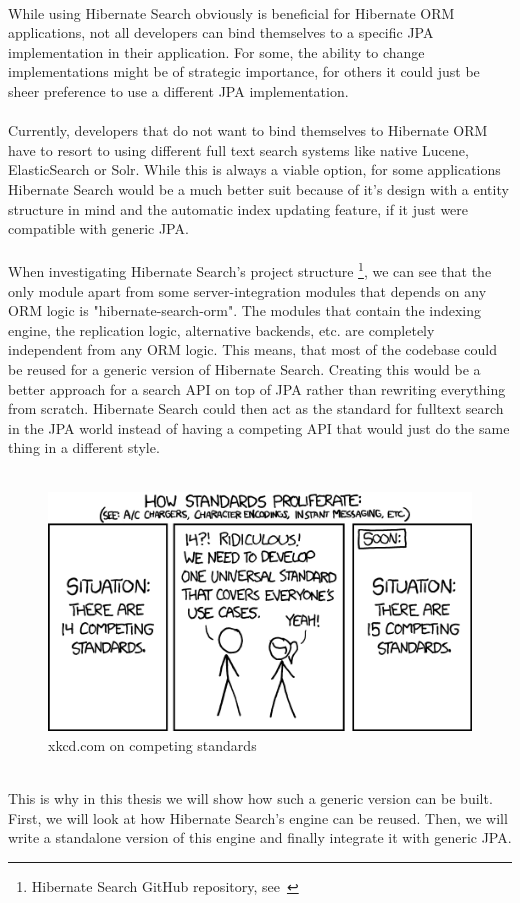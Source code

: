 \\
While using Hibernate Search obviously is beneficial for Hibernate ORM applications, not all developers can bind themselves to a specific JPA implementation in their application. For some, the ability to change implementations might be of strategic importance, for others it could just be sheer preference to use a different JPA implementation.
\\\\
Currently, developers that do not want to bind themselves to Hibernate ORM have to resort to using different full text search systems like native Lucene, ElasticSearch or Solr. While this is always a viable option, for some applications Hibernate Search would be a much better suit because of it's design with a entity structure in mind and the automatic index updating feature, if it just were compatible with generic JPA.
\\\\
When investigating Hibernate Search's project structure
\footnote{Hibernate Search GitHub repository, see~\cite{hsearch_source_code_git}}, we can see that the only module apart from some server-integration modules that depends on any ORM logic is "hibernate-search-orm". The modules that contain the indexing engine, the replication logic, alternative backends, etc. are completely independent from any ORM logic. This means, that most of the codebase could be reused for a generic version of Hibernate Search.
\newpage
\noindent
Creating this would be a better approach for a search API on top of JPA rather than rewriting everything from scratch. Hibernate Search could then act as the standard for fulltext search in the JPA world instead of having a competing API that would just do the same thing in a different style.
\\\\
\begin{figure}[ht]
	\centering
	\includegraphics[scale=0.5]{images/competing_standards.png}
	\caption{xkcd.com on competing standards \protect\footnotemark}
	\label{xkcd_standards_fig}
\end{figure}
\\
This is why in this thesis we will show how such a generic version can be built. First, we will look at how Hibernate Search's engine can be reused. Then, we will write a standalone version of this engine and finally integrate it with generic JPA.

\pagebreak
